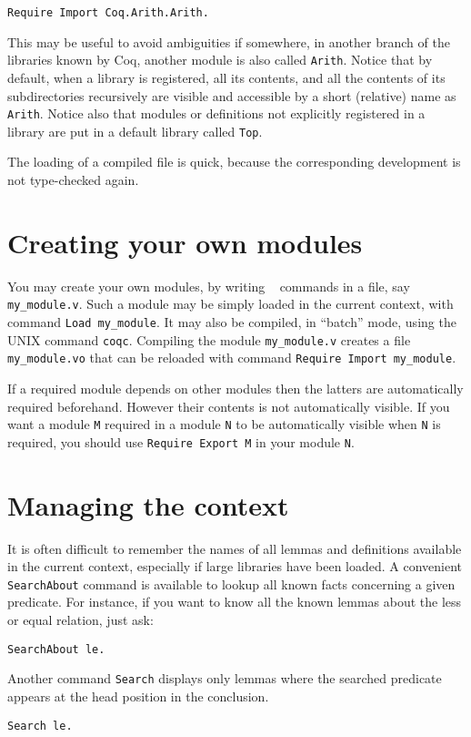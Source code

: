 \documentclass{book}
\begin{document}
\begin{lstlisting}
Require Import Coq.Arith.Arith.
\end{lstlisting}

This may be useful to avoid ambiguities if somewhere, in another branch
of the libraries known by Coq, another module is also called
\verb=Arith=. Notice that by default, when a library is registered,
all its contents, and all the contents of its subdirectories recursively are
visible and accessible by a short (relative) name as \verb=Arith=.
Notice also that modules or definitions not explicitly registered in
a library are put in a default library called \verb=Top=.

The loading of a compiled file is quick, because the corresponding
development is not type-checked again. 

\section{Creating your own modules}

You may create your own modules, by writing \Coq~ commands in a file,
say \verb:my_module.v:. Such a module may be simply loaded in the current
context, with command \verb:Load my_module:. It may also be compiled,
in ``batch'' mode, using the UNIX command
\verb:coqc:. Compiling the module \verb:my_module.v: creates a 
file \verb:my_module.vo:{} that can be reloaded with command
\verb:Require Import my_module:. 

If a required module depends on other modules then the latters are
automatically required beforehand. However their contents is not
automatically visible.  If you want a module \verb=M= required in a
module \verb=N= to be automatically visible when \verb=N= is required,
you should use \verb:Require Export M: in your module \verb:N:.

\section{Managing the context}

It is often difficult to remember the names of all lemmas and
definitions available in the current context, especially if large
libraries have been loaded. A convenient \verb:SearchAbout: command
is available to lookup all known facts 
concerning a given predicate. For instance, if you want to know all the
known lemmas about the less or equal relation, just ask:
\begin{lstlisting}
SearchAbout le.
\end{lstlisting}
Another command \verb:Search: displays only lemmas where the searched
predicate appears at the head position in the conclusion.
\begin{lstlisting}
Search le.
\end{lstlisting}
\end{document}
